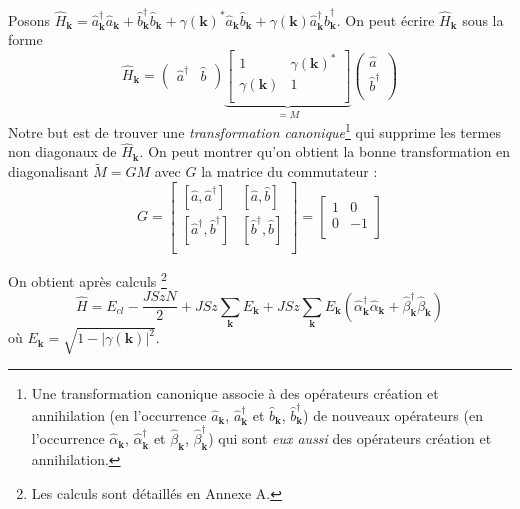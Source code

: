 \documentclass[a4paper, french]{report}
\newcommand{\an}{\hat{a}}
\newcommand{\cre}{\hat{a}^\dagger}
\newcommand{\h}{\ensuremath{\hat{H}}\xspace}
\newcommand{\ban}{\hat{b}}
\newcommand{\bcre}{\hat{b}^\dagger}
\newcommand{\ond}{\ensuremath{\mathbf{k}\xspace}}
\newcommand{\ank}{\an_{\ond}}
\newcommand{\crek}{\cre_{\ond}}
\newcommand{\bank}{\ban_{\ond}}
\newcommand{\bcrek}{\bcre_{\ond}}
\newcommand{\gam}{\gamma(\ond{})}
\newcommand{\alcre}{\hat{\alpha}^\dagger_{\ond}}
\newcommand{\alan}{\hat{\alpha}_{\ond}}
\newcommand{\betcre}{\hat{\beta}^\dagger_{\ond}}
\newcommand{\betan}{\hat{\beta}_{\ond}}
\newcommand{\1}{\ensuremath{\ket{\om_1\bom_1}}\xspace}
\newcommand{\2}{\ensuremath{\ket{\om_2\bom_2}}\xspace}
\begin{document}
Posons $\h_{\ond}=\crek\ank+\bcrek\bank+\gam^*\ank\bank+\gam\crek\bcrek$. On peut écrire $\h_{\ond}$ sous la forme
\begin{equation}
	\h_{\ond}=
	\begin{pmatrix}
	\cre & \ban\\
	\end{pmatrix}
	\underbrace{
	\begin{bmatrix}
	1 & \gam^*\\
	\gam & 1\\
	\end{bmatrix}
	}_{=M}
	\begin{pmatrix}
	\an\\
	\bcre\\
	\end{pmatrix}
\end{equation}
Notre but est de trouver une \emph{transformation canonique}\footnote{Une transformation canonique associe à des opérateurs création et annihilation (en l'occurrence $\ank$, $\crek$ et $\bank$, $\bcrek$) de nouveaux opérateurs (en l'occurrence $\alan$, $\alcre$ et $\betan$, $\betcre$) qui sont \emph{eux aussi} des opérateurs création et annihilation.} qui supprime les termes non diagonaux de $\h_{\ond}$. 
On peut montrer qu'on obtient la bonne transformation en diagonalisant $\tilde M=GM$ avec $G$ la matrice du commutateur :
\[
	G=
	\begin{bmatrix}
	[\an,\cre] & [\an,\ban]\\
	[\cre,\bcre] & [\bcre,\ban]\\
	\end{bmatrix}
	=
	\begin{bmatrix}
	1 & 0\\
	0 & -1\\
	\end{bmatrix}
\]
 
On obtient après calculs \footnote{Les calculs sont détaillés en Annexe A.}
\begin{equation}
\label{eq:ondspindecoupl}
	\h=E_{cl}-\frac{JSzN}{2}+JSz\sum_{\ond}E_{\ond}+JSz\sum_{\ond}E_{\ond}(\alcre\alan+\betcre\betan)
\end{equation}
où $E_{\ond}=\sqrt{1-|\gam|^2}$.
\end{document}
